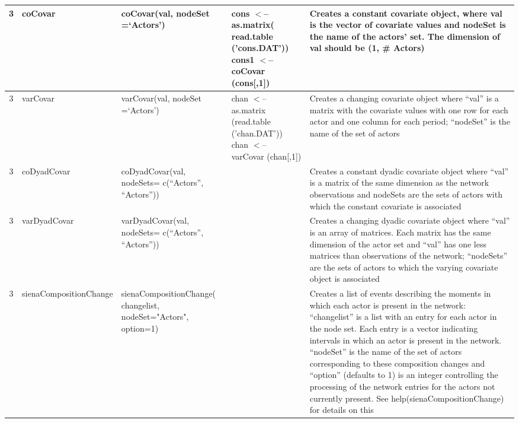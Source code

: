 \documentclass[a4paper,fleqn,11pt]{article}
\newcommand{\+}{\, + \,}
\begin{document}
\begin{landscape}
\begin{small}
\begin{longtable}{c | p{2.4cm} | p{4.5cm} | p{4.0cm} | p{9.0cm} }
3 &coCovar & coCovar(val, \newline
nodeSet =`Actors') & cons $<$-- \newline
as.matrix( read.table \newline
('cons.DAT')) \newline cons1 $<$--\newline
 coCovar (cons[,1]) & Creates a constant
covariate object, where val is the vector of covariate values and nodeSet is
the name of the actors' set.  The dimension of val should be (1, \#
Actors)\\
\hline

3 & varCovar & varCovar(val, \newline
nodeSet =`Actors') & chan $<$-- as.matrix \newline
(read.table ('chan.DAT')) \newline chan $<$-- \newline
varCovar (chan[,1]) & Creates a
changing covariate object where ``val'' is a matrix with the covariate values
with one row for each actor and one column for each period; ``nodeSet'' is the
name of the set of actors \\
\hline

3& coDyadCovar &coDyadCovar(val, \newline
nodeSets= \newline
c(``Actors'', ``Actors'')) & &
Creates a constant dyadic covariate object where ``val'' is a matrix of the
same dimension as the network observations and nodeSets are the sets of actors
with
which the constant covariate is associated\\
\hline

3 &varDyadCovar & varDyadCovar(val, \newline
nodeSets= \newline
c(``Actors'', ``Actors'')) &
&Creates a changing dyadic covariate object where ``val'' is an array of
matrices. Each matrix has the same dimension of the actor set and ``val'' has
one less matrices than observations of the network; ``nodeSets'' are the sets
of actors to which the varying covariate object is associated\\
\hline

3 & sienaCompositionChange & \newline
sienaCompositionChange( changelist,\newline
nodeSet="Actors", \newline
option=1) & & Creates a list of events describing the moments
in which each actor is present in the network: ``changelist'' is a list with an
entry for each actor in the node set. Each entry is a vector indicating
intervals in which an actor is present in the network. ``nodeSet'' is the name
of the set of actors corresponding to these composition changes and ``option''
(defaults to 1) is an integer controlling the processing of the network entries
for the actors not currently present. See help(sienaCompositionChange) for
details on this\\
\hline


\end{longtable}
\end{small}
\end{landscape}
\end{document}
